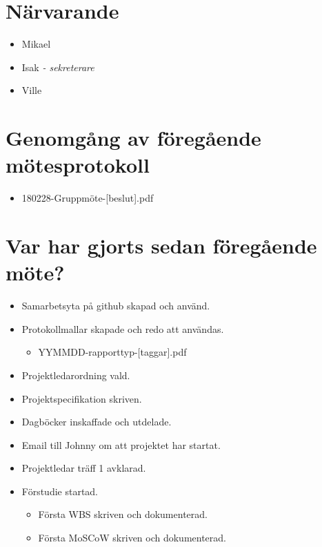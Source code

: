 
\section*{Närvarande}
\begin{itemize}[noitemsep]
    \item Mikael
    \item Isak \textit{- sekreterare}
    \item Ville
\end{itemize}

\section*{Genomgång av föregående mötesprotokoll}
\begin{itemize}[noitemsep]
    \item 180228-Gruppmöte-[beslut].pdf
\end{itemize}

\section*{Var har gjorts sedan föregående möte?}
\begin{itemize}[noitemsep]
    \item Samarbetsyta på github skapad och använd.
    \item Protokollmallar skapade och redo att användas.
    \begin{itemize}[noitemsep]
        \item YYMMDD-rapporttyp-[taggar].pdf
    \end{itemize}
    \item Projektledarordning vald.
    \item Projektspecifikation skriven.
    \item Dagböcker inskaffade och utdelade.
    \item Email till Johnny om att projektet har startat.
    \item Projektledar träff 1 avklarad.
    \item Förstudie startad.
    \begin{itemize}[noitemsep]
        \item Första WBS skriven och dokumenterad.
        \item Första MoSCoW skriven och dokumenterad.
    \end{itemize}
\end{itemize}

